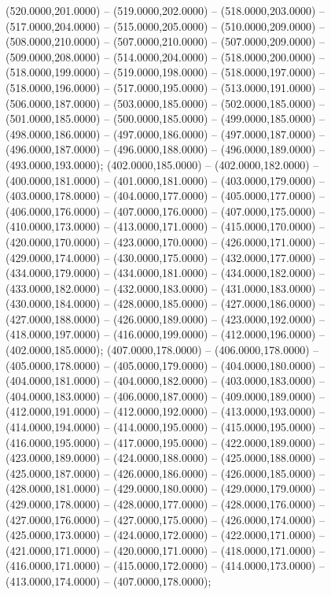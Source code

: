 \begin{scope}[draw=black,fill=cfdae61,line join=round,line width=0.208pt]
    (520.0000,201.0000) -- (519.0000,202.0000) -- (518.0000,203.0000) --
    (517.0000,204.0000) -- (515.0000,205.0000) -- (510.0000,209.0000) --
    (508.0000,210.0000) -- (507.0000,210.0000) -- (507.0000,209.0000) --
    (509.0000,208.0000) -- (514.0000,204.0000) -- (518.0000,200.0000) --
    (518.0000,199.0000) -- (519.0000,198.0000) -- (518.0000,197.0000) --
    (518.0000,196.0000) -- (517.0000,195.0000) -- (513.0000,191.0000) --
    (506.0000,187.0000) -- (503.0000,185.0000) -- (502.0000,185.0000) --
    (501.0000,185.0000) -- (500.0000,185.0000) -- (499.0000,185.0000) --
    (498.0000,186.0000) -- (497.0000,186.0000) -- (497.0000,187.0000) --
    (496.0000,187.0000) -- (496.0000,188.0000) -- (496.0000,189.0000) --
    (493.0000,193.0000);
   (402.0000,185.0000) -- (402.0000,182.0000) --
    (400.0000,181.0000) -- (401.0000,181.0000) -- (403.0000,179.0000) --
    (403.0000,178.0000) -- (404.0000,177.0000) -- (405.0000,177.0000) --
    (406.0000,176.0000) -- (407.0000,176.0000) -- (407.0000,175.0000) --
    (410.0000,173.0000) -- (413.0000,171.0000) -- (415.0000,170.0000) --
    (420.0000,170.0000) -- (423.0000,170.0000) -- (426.0000,171.0000) --
    (429.0000,174.0000) -- (430.0000,175.0000) -- (432.0000,177.0000) --
    (434.0000,179.0000) -- (434.0000,181.0000) -- (434.0000,182.0000) --
    (433.0000,182.0000) -- (432.0000,183.0000) -- (431.0000,183.0000) --
    (430.0000,184.0000) -- (428.0000,185.0000) -- (427.0000,186.0000) --
    (427.0000,188.0000) -- (426.0000,189.0000) -- (423.0000,192.0000) --
    (418.0000,197.0000) -- (416.0000,199.0000) -- (412.0000,196.0000) --
    (402.0000,185.0000);
   (407.0000,178.0000) -- (406.0000,178.0000) --
    (405.0000,178.0000) -- (405.0000,179.0000) -- (404.0000,180.0000) --
    (404.0000,181.0000) -- (404.0000,182.0000) -- (403.0000,183.0000) --
    (404.0000,183.0000) -- (406.0000,187.0000) -- (409.0000,189.0000) --
    (412.0000,191.0000) -- (412.0000,192.0000) -- (413.0000,193.0000) --
    (414.0000,194.0000) -- (414.0000,195.0000) -- (415.0000,195.0000) --
    (416.0000,195.0000) -- (417.0000,195.0000) -- (422.0000,189.0000) --
    (423.0000,189.0000) -- (424.0000,188.0000) -- (425.0000,188.0000) --
    (425.0000,187.0000) -- (426.0000,186.0000) -- (426.0000,185.0000) --
    (428.0000,181.0000) -- (429.0000,180.0000) -- (429.0000,179.0000) --
    (429.0000,178.0000) -- (428.0000,177.0000) -- (428.0000,176.0000) --
    (427.0000,176.0000) -- (427.0000,175.0000) -- (426.0000,174.0000) --
    (425.0000,173.0000) -- (424.0000,172.0000) -- (422.0000,171.0000) --
    (421.0000,171.0000) -- (420.0000,171.0000) -- (418.0000,171.0000) --
    (416.0000,171.0000) -- (415.0000,172.0000) -- (414.0000,173.0000) --
    (413.0000,174.0000) -- (407.0000,178.0000);
\end{scope}
